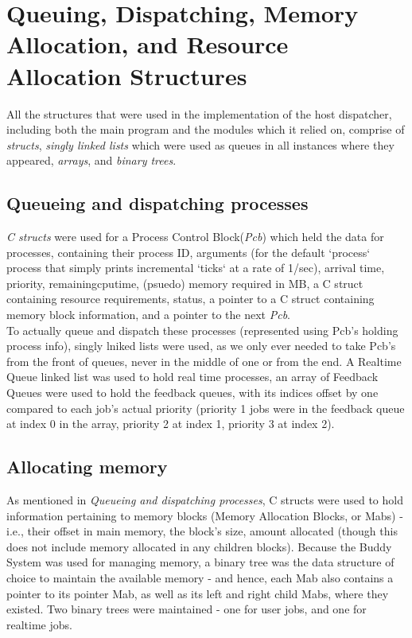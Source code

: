 \documentclass[11pt]{article}
\begin{document}
\section{Queuing, Dispatching, Memory Allocation, and Resource Allocation Structures}

\iffalse
(Provides thorough description of ALL dispatcher structures that are relevant to host dispatcher implementation - 5 marks + 1 bonus)

b. Describe and discuss the structures used by the dispatcher for queuing,
dispatching and allocating memory and other resources.

structs, linked lists, [trg]
\fi

All the structures that were used in the implementation of the host dispatcher, including both the main program and the modules which it relied on, comprise of \textit{structs}, \textit{singly linked lists} which were used as queues in all instances where they appeared, \textit{arrays}, and \textit{binary trees}.

\subsection{Queueing and dispatching processes}
\textit{C structs} were used for a Process Control Block(\textit{Pcb}) which held the data for processes, containing their process ID, arguments (for the default `process` process that simply prints incremental `ticks` at a rate of 1/sec), arrival time, priority, remainingcputime, (psuedo) memory required in MB, a C struct containing resource requirements, status, a pointer to a C struct containing memory block information, and a pointer to the next \textit{Pcb}.\\

To actually queue and dispatch these processes (represented using Pcb's holding process info), singly lniked lists were used, as we only ever needed to take Pcb's from the front of queues, never in the middle of one or from the end. A Realtime Queue linked list was used to hold real time processes, an array of Feedback Queues were used to hold the feedback queues, with its indices offset by one compared to each job's actual priority (priority 1 jobs were in the feedback queue at index 0 in the array, priority 2 at index 1, priority 3 at index 2).\\

\subsection{Allocating memory}
As mentioned in \textit{Queueing and dispatching processes}, C structs were used to hold information pertaining to memory blocks (Memory Allocation Blocks, or Mabs) - i.e., their offset in main memory, the block's size, amount allocated (though this does not include memory allocated in any children blocks). Because the Buddy System was used for managing memory, a binary tree was the data structure of choice to maintain the available memory - and hence, each Mab also contains a pointer to its pointer Mab, as well as its left and right child Mabs, where they existed. Two binary trees were maintained - one for user jobs, and one for realtime jobs. 
\end{document}
